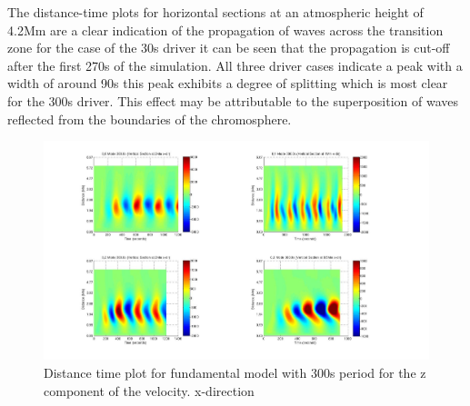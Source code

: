 \documentclass[final,1p]{elsarticle}
\begin{document}
The distance-time plots  for horizontal sections at an atmospheric height of 4.2Mm are a clear indication of the propagation of waves across the transition zone for the case of the 30s driver it can be seen that  the propagation is cut-off after the first 270s of the simulation. All three driver cases indicate a peak with a width of around 90s this peak exhibits a degree of splitting which is most clear for the 300s driver.  This effect may be attributable to the superposition of waves reflected from the boundaries of the chromosphere.












\begin{figure}[h]
\includegraphics[scale=0.3]{imagesn/dt_300_vert_x.jpg}
\caption{Distance time plot for fundamental model with 300s period for the z component of the velocity. x-direction }
\label{dt_300_vert_x}
\end{figure}

\end{document}
